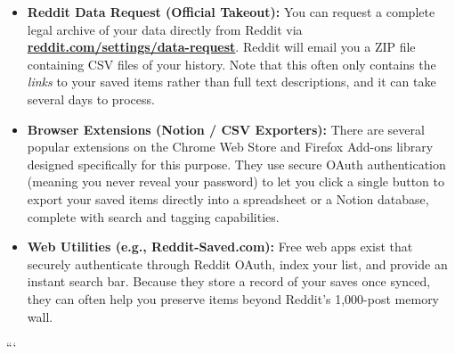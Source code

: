 \documentclass[
  letterpaper,
  DIV=11,
  numbers=noendperiod]{scrartcl}
\providecommand{\tightlist}{%
  \setlength{\itemsep}{0pt}\setlength{\parskip}{0pt}}\usepackage{longtable,booktabs,array}
\begin{document}
\begin{itemize}
\tightlist
\item
  \textbf{Reddit Data Request (Official Takeout):} You can request a
  complete legal archive of your data directly from Reddit via
  \textbf{\href{https://www.google.com/search?q=https://reddit.com/settings/data-request}{reddit.com/settings/data-request}}.
  Reddit will email you a ZIP file containing CSV files of your history.
  Note that this often only contains the \emph{links} to your saved
  items rather than full text descriptions, and it can take several days
  to process.
\item
  \textbf{Browser Extensions (Notion / CSV Exporters):} There are
  several popular extensions on the Chrome Web Store and Firefox Add-ons
  library designed specifically for this purpose. They use secure OAuth
  authentication (meaning you never reveal your password) to let you
  click a single button to export your saved items directly into a
  spreadsheet or a Notion database, complete with search and tagging
  capabilities.
\item
  \textbf{Web Utilities (e.g., Reddit-Saved.com):} Free web apps exist
  that securely authenticate through Reddit OAuth, index your list, and
  provide an instant search bar. Because they store a record of your
  saves once synced, they can often help you preserve items beyond
  Reddit's 1,000-post memory wall.
\end{itemize}

```
\end{document}
